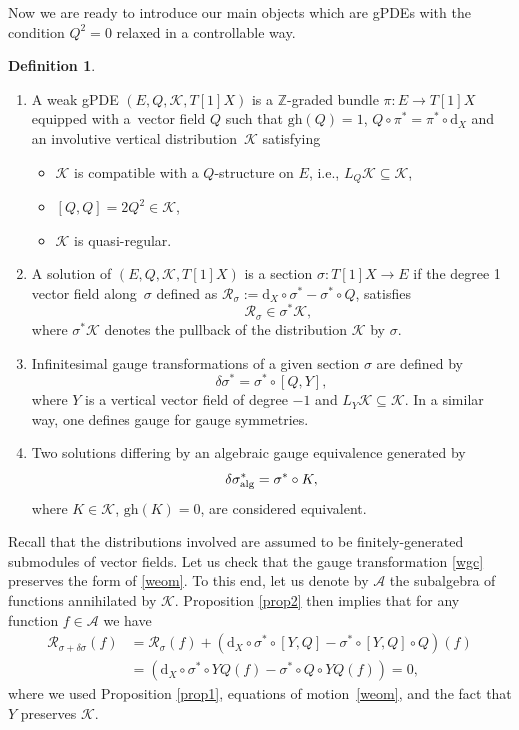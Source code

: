\documentclass[pdftex]{sigma}
\numberwithin{equation}{section}
\theoremstyle{definition}
\newtheorem{Definition}[Theorem]{Definition}
\newcommand{\gh}[1]{\mathrm{gh}(#1)}
\newcommand{\dx}{\mathrm{d}_X}
\def\cK{\mathcal{K}}
\begin{document}
Now we are ready to introduce our main objects which are gPDEs with the condition $Q^2=0$ relaxed in a controllable way.
\begin{Definition}\label{def:WGPDE}
\quad
\begin{enumerate}\itemsep=0pt
 \item A weak gPDE $(E,Q,\cK,T[1]X)$ is a $\mathbb{Z}$-graded bundle $\pi\colon E\rightarrow T[1]X$ equipped with a~vector field $Q$ such that $\gh Q=1$, $Q\circ\pi^*=\pi^*\circ \dx$ and an involutive vertical distribution~$\mathcal{K}$ satisfying
 \begin{itemize}\itemsep=0pt
 \item $\mathcal{K}$ is compatible with a $Q$-structure on $E$, i.e., $L_Q \mathcal{K}\subseteq\mathcal{K}$,
 \item $[Q,Q]=2Q^2\in \mathcal{K}$,
 \item $\mathcal{K}$ is quasi-regular.
 \end{itemize}
\item A solution of $(E,Q,\cK,T[1]X)$ is a section $\sigma\colon T[1]X\rightarrow E$ if the degree 1 vector field along~$\sigma$ defined as $\mathcal{R}_{\sigma}:=\dx\circ \sigma^*-\sigma^*\circ Q$, satisfies
\begin{equation}\label{weom}
\quad \mathcal{R}_{\sigma}\in\sigma^*\mathcal{K},
\end{equation}
where $\sigma^*\mathcal{K}$ denotes the pullback of the distribution $\mathcal{K}$ by $\sigma$.
\item Infinitesimal gauge transformations of a given section $\sigma$ are defined by
\begin{equation}\label{wgc}
 \delta\sigma^*=\sigma^*\circ [Q,Y],
\end{equation}
 where $Y$ is a vertical vector field of degree $-1$ and $L_Y\mathcal{K}\subseteq\mathcal{K}$. In a similar way, one defines gauge for gauge symmetries.
 \item Two solutions differing by an algebraic gauge equivalence generated by{\samepage
 \begin{equation*}
 \delta\sigma^*_{\rm alg}=\sigma^*\circ K,
 \end{equation*}
where $K\in \mathcal{K}$, $\gh{K}=0$, are considered equivalent.}
\end{enumerate}
\end{Definition}
Recall that the distributions involved are assumed to be finitely-generated submodules of vector fields. Let us check that the gauge transformation \eqref{wgc} preserves the form of \eqref{weom}. To this end, let us denote by $\mathcal{A}$ the subalgebra of functions annihilated by $\mathcal{K}$. Proposition \ref{prop2} then implies that for any function $f\in\mathcal{A}$ we have
\begin{align*}
\mathcal{R}_{\sigma+\delta\sigma}(f)&{}=\mathcal{R}_{\sigma}(f)+(\dx\circ\sigma^*\circ[Y,Q]-\sigma^*\circ[Y,Q]\circ Q)(f)\\
&{}=(\dx\circ\sigma^*\circ YQ(f)-\sigma^*\circ Q\circ YQ(f))=0,
\end{align*}
where we used Proposition \ref{prop1}, equations of motion~\ref{weom}, and the fact that $Y$ preserves $\mathcal{K}$.
\end{document}
